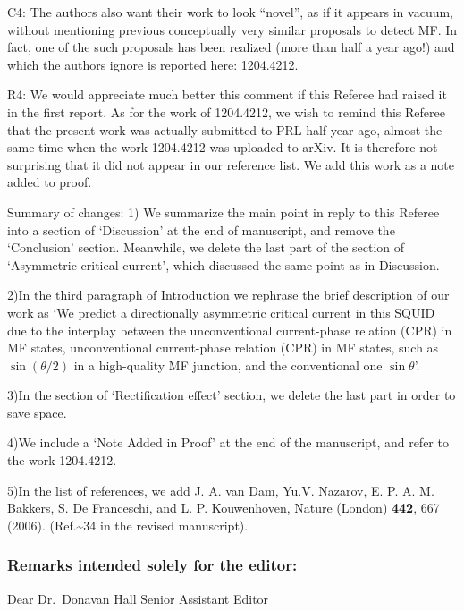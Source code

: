 \documentclass[11pt]{article}
\begin{document}
C4: The authors also want their work to look ``novel'', as if it appears
in vacuum, without mentioning previous conceptually very similar
proposals to detect MF. In fact, one of the such proposals has been
realized (more than half a year ago!) and which the authors ignore is
reported here: 1204.4212.

R4: We would appreciate much better this comment if this Referee had
raised it in the first report. As for the work of 1204.4212, we wish to
remind this Referee that the present work was actually submitted to PRL
half year ago, almost the same time when the work 1204.4212 was uploaded
to arXiv. It is therefore not surprising that it did not appear in our
reference list. We add this work as a note added to proof.

Summary of changes: 1) We summarize the main point in reply to this
Referee into a section of `Discussion' at the end of manuscript, and
remove the `Conclusion' section. Meanwhile, we delete the last part of
the section of `Asymmetric critical current', which discussed the same
point as in Discussion.

2)In the third paragraph of Introduction we rephrase the brief
description of our work as `We predict a directionally asymmetric
critical current in this SQUID due to the interplay between the
unconventional current-phase relation (CPR) in MF states, unconventional
current-phase relation (CPR) in MF states, such as \(\sin (\theta/2)\)
in a high-quality MF junction, and the conventional one
\(\sin \theta\)'.

3)In the section of `Rectification effect' section, we delete the last
part in order to save space.

4)We include a `Note Added in Proof' at the end of the manuscript, and
refer to the work 1204.4212.

5)In the list of references, we add J. A. van Dam, Yu.V. Nazarov, E. P.
A. M. Bakkers, S. De Franceschi, and L. P. Kouwenhoven, Nature (London)
\textbf{442}, 667 (2006). (Ref.\textasciitilde{}34 in the revised
manuscript).

\hypertarget{remarks-intended-solely-for-the-editor-1}{%
\subsubsection{Remarks intended solely for the
editor:}\label{remarks-intended-solely-for-the-editor-1}}

Dear Dr.~Donavan Hall Senior Assistant Editor
\end{document}
